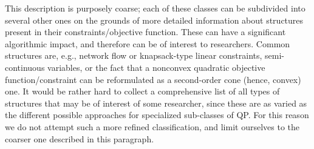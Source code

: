 This description is purposely coarse; each of these classes can be subdivided into several other ones on the grounds of more detailed information about structures present in their constraints/objective function. These can have a significant algorithmic impact, and therefore can be of interest to researchers. Common structures are, e.g., network flow or knapsack-type linear constraints, semi-continuous variables, or the fact that a nonconvex quadratic objective function/constraint can be reformulated as a second-order cone (hence, convex) one. It would be rather hard to collect a comprehensive list of all types of structures that may be of interest of some researcher, since these are as varied as the different possible approaches for specialized sub-classes of QP. For this reason we do not attempt such a more refined classification, and limit ourselves to the coarser one described in this paragraph.

